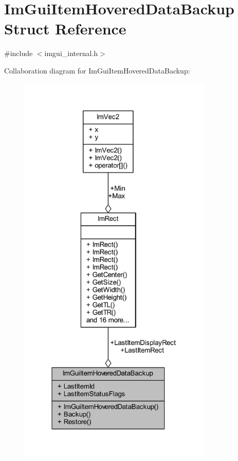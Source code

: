 \hypertarget{struct_im_gui_item_hovered_data_backup}{}\section{Im\+Gui\+Item\+Hovered\+Data\+Backup Struct Reference}
\label{struct_im_gui_item_hovered_data_backup}


{\ttfamily \#include $<$imgui\+\_\+internal.\+h$>$}



Collaboration diagram for Im\+Gui\+Item\+Hovered\+Data\+Backup\+:
\nopagebreak
\begin{figure}[H]
\begin{center}
\leavevmode
\includegraphics[width=262pt]{struct_im_gui_item_hovered_data_backup__coll__graph}
\end{center}
\end{figure}
